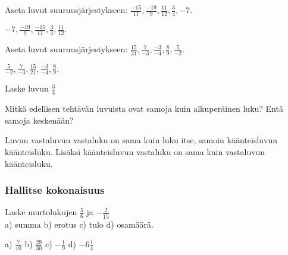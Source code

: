 \begin{tehtavasivu}
\begin{tehtava}
Aseta luvut suuruusjärjestykseen:
\mbox{$\frac{-15}{11}, \frac{-19}{9}, \frac{11}{12}, \frac{3}{4}, -7.$}
\begin{vastaus}
$-7, \frac{-19}{9}, \frac{-15}{11}, \frac{3}{4}, \frac{11}{12}.$
\end{vastaus}
\end{tehtava}

\begin{tehtava}
Aseta luvut suuruusjärjestykseen:
\mbox{$\frac{15}{21}, \frac{7}{-3}, \frac{-3}{-4}, \frac{8}{9}, \frac{5}{-2}.$}
\begin{vastaus}
$\frac{5}{-2}, \frac{7}{-3}, \frac{15}{21}, \frac{-3}{-4}, \frac{8}{9}.$
\end{vastaus}
\end{tehtava}

\begin{tehtava}
Laske luvun $\frac{3}{4}$
	\begin{alakohdat}
	\end{alakohdat}
	\begin{vastaus}
		\begin{alakohdat}
			\alakohta{$\frac{-3}{4}$}
			\alakohta{$\frac{4}{3}$}
			\alakohta{$\frac{3}{4}$}
			\alakohta{$-\frac{4}{3}$}
			\alakohta{$-\frac{4}{3}$}
			\alakohta{$\frac{3}{4}$}
		\end{alakohdat}
	\end{vastaus}
\end{tehtava}

\begin{tehtava}
Mitkä edellisen tehtävän luvuista ovat samoja kuin alkuperäinen luku? Entä samoja keskenään?
	\begin{vastaus}
		Luvun vastaluvun vastaluku on sama kuin luku itse, samoin käänteisluvun käänteisluku. Lisäksi käänteisluvun vastaluku on sama kuin vastaluvun käänteisluku. 
	\end{vastaus}
\end{tehtava}

\subsubsection*{Hallitse kokonaisuus}

\begin{tehtava}
Laske murtolukujen $\frac{5}{6}$ ja $-\frac{2}{15}$ \\ a) summa \qquad b) erotus \qquad c) tulo \qquad d) osamäärä.
\begin{vastaus}
a) $\frac{7}{10}$ \qquad b) $\frac{29}{30}$ \qquad c) $-\frac{1}{9}$ \qquad d) $-6\frac{1}{4}$
\end{vastaus}
\end{tehtava}


\end{tehtavasivu}
